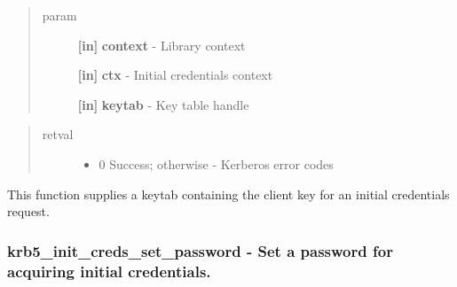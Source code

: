 \documentclass[letterpaper,10pt,english]{sphinxmanual}
\begin{document}
\begin{quote}\begin{description}
\item[{param}] \leavevmode
\textbf{{[}in{]}} \textbf{context} - Library context

\textbf{{[}in{]}} \textbf{ctx} - Initial credentials context

\textbf{{[}in{]}} \textbf{keytab} - Key table handle

\end{description}\end{quote}
\begin{quote}\begin{description}
\item[{retval}] \leavevmode\begin{itemize}
\item {} 
0   Success; otherwise - Kerberos error codes

\end{itemize}

\end{description}\end{quote}

This function supplies a keytab containing the client key for an initial credentials request.


\subsubsection{krb5\_init\_creds\_set\_password -  Set a password for acquiring initial credentials.}
\label{appdev/refs/api/krb5_init_creds_set_password:krb5-init-creds-set-password-set-a-password-for-acquiring-initial-credentials}\label{appdev/refs/api/krb5_init_creds_set_password::doc}

\begin{fulllineitems}
\label{appdev/refs/api/krb5_init_creds_set_password:c.krb5_init_creds_set_password}
\end{fulllineitems}
\end{document}
